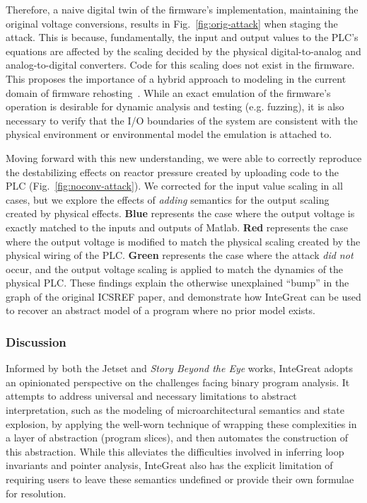 Therefore, a naive digital twin of the firmware's implementation, maintaining the original voltage conversions, results in Fig.~\ref{fig:orig-attack} when staging the attack.
This is because, fundamentally, the input and output values to the PLC's equations are affected by the scaling decided by the physical digital-to-analog and analog-to-digital converters.
Code for this scaling does not exist in the firmware.
This proposes the importance of a hybrid approach to modeling in the current domain of firmware rehosting~\cite{jetset,p2im,halucinator}.
While an exact emulation of the firmware's operation is desirable for dynamic analysis and testing (e.g. fuzzing), it is also necessary to verify that the I/O boundaries of the system are consistent with the physical environment or environmental model the emulation is attached to.

Moving forward with this new understanding, we were able to correctly reproduce the destabilizing effects on reactor pressure created by uploading code to the PLC (Fig.~\ref{fig:noconv-attack}).
We corrected for the input value scaling in all cases, but we explore the effects of \emph{adding} semantics for the output scaling created by physical effects.
\textbf{Blue} represents the case where the output voltage is exactly matched to the inputs and outputs of Matlab. \textbf{Red} represents the case where the output voltage is modified to match the physical scaling created by the physical wiring of the PLC. \textbf{Green} represents the case where the attack \emph{did not} occur, and the output voltage scaling is applied to match the dynamics of the physical PLC.
These findings explain the otherwise unexplained ``bump'' in the graph of the original ICSREF paper, and demonstrate how InteGreat can be used to recover an abstract model of a program where no prior model exists.

\subsubsection{Discussion}

Informed by both the Jetset and \emph{Story Beyond the Eye} works, InteGreat adopts an opinionated perspective on the challenges facing binary program analysis.
It attempts to address universal and necessary limitations to abstract interpretation, such as the modeling of microarchitectural semantics and state explosion, by applying the well-worn technique of wrapping these complexities in a layer of abstraction (program slices), and then automates the construction of this abstraction.
While this alleviates the difficulties involved in inferring loop invariants and pointer analysis, InteGreat also has the explicit limitation of requiring users to leave these semantics undefined or provide their own formulae for resolution.

